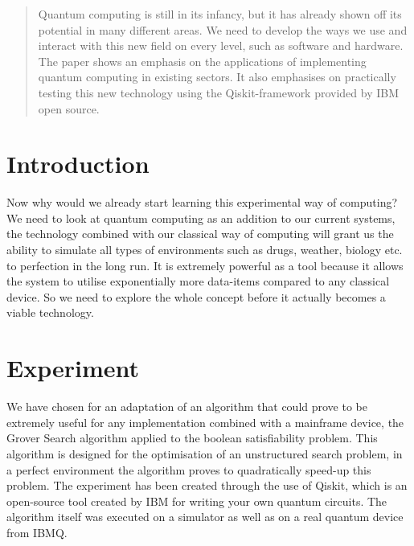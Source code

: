 \documentclass[a0,portrait]{a0poster}
\begin{document}
\begin{multicols}{2} %

\color{HoGentAccent1} %

\begin{abstract}
	Quantum computing is still in its infancy, but it has already shown off its potential in many different areas. We need to develop the ways we use and interact with this new field on every level, such as software and hardware. The paper shows an emphasis on the applications of implementing quantum computing in existing sectors. It also emphasises on practically testing this new technology using the Qiskit-framework provided by IBM open source.
\end{abstract}

\color{HoGentAccent1} 
\section*{Introduction}
\color{black}
\color{black}
Now why would we already start learning this experimental way of computing? We need to look at quantum computing as an addition to our current systems, the technology combined with our classical way of computing will grant us the ability to simulate all types of environments such as drugs, weather, biology etc. to perfection in the long run. It is extremely powerful as a tool because it allows the system to utilise exponentially more data-items compared to any classical device. So we need to explore the whole concept before it actually becomes a viable technology.

\color{Black} %
\color{HoGentAccent1} 
\section*{Experiment}
\color{black}
We have chosen for an adaptation of an algorithm that could prove to be extremely useful for
any implementation combined with a mainframe device, the Grover Search algorithm applied to the boolean satisfiability problem. 
This algorithm is designed for the optimisation of an unstructured search problem, in a perfect environment the algorithm proves to quadratically speed-up this problem. The experiment has been created through the use of Qiskit, which is an open-source tool created by IBM for writing your own quantum circuits. The algorithm itself was executed on a simulator as well as on a real quantum device from IBMQ.


\end{multicols}
\end{document}
